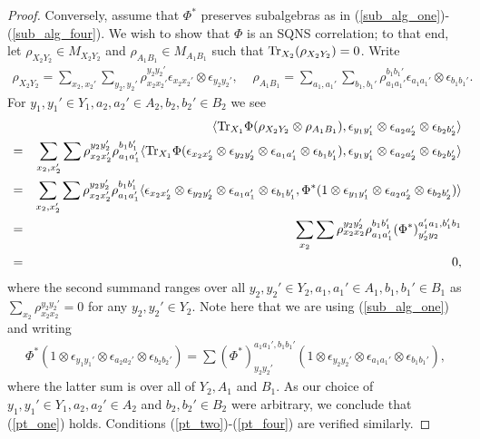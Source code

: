 \documentclass[11pt]{amsart}
\begin{document}
\begin{proof}
Conversely, assume that $\Phi^{*}$ preserves subalgebras as in (\ref{sub_alg_one})-(\ref{sub_alg_four}). We wish to show that $\Phi$ is an SQNS correlation; to that end, let $\rho_{X_{2}Y_{2}} \in M_{X_{2}Y_{2}}$ and $\rho_{A_{1}B_{1}} \in M_{A_{1}B_{1}}$ such that ${\rm Tr}_{X_{2}}(\rho_{X_{2}Y_{2}}) = 0$. Write
\begin{gather*}
	\rho_{X_{2}Y_{2}} = \sum\limits_{x_{2}, x_{2}'}\sum\limits_{y_{2}, y_{2}'}\rho_{x_{2}x_{2}'}^{y_{2}y_{2}'}\epsilon_{x_{2}x_{2}'}\otimes \epsilon_{y_{2}y_{2}'}, \;\;\;\; \rho_{A_{1}B_{1}} = \sum\limits_{a_{1}, a_{1}'}\sum\limits_{b_{1}, b_{1}'}\rho_{a_{1}a_{1}'}^{b_{1}b_{1}'}\epsilon_{a_{1}a_{1}'}\otimes \epsilon_{b_{1}b_{1}'}.
\end{gather*}
\noindent For $y_{1}, y_{1}' \in Y_{1}, a_{2}, a_{2}' \in A_{2}, b_{2}, b_{2}' \in B_{2}$ we see
\begin{eqnarray*}
& &
\langle {\rm Tr}_{X_{1}}\Phi(\rho_{X_{2}Y_{2}}\otimes \rho_{A_{1}B_{1}}), \epsilon_{y_{1}y_{1}'}\otimes \epsilon_{a_{2}a_{2}'}\otimes \epsilon_{b_{2}b_{2}'}\rangle \\
& = &
\sum\limits_{x_{2}, x_{2}'}\sum\rho_{x_{2}x_{2}'}^{y_{2}y_{2}'}\rho_{a_{1}a_{1}'}^{b_{1}b_{1}'}\langle {\rm Tr}_{X_{1}}\Phi(\epsilon_{x_{2}x_{2}'}\otimes \epsilon_{y_{2}y_{2}'}\otimes \epsilon_{a_{1}a_{1}'}\otimes \epsilon_{b_{1}b_{1}'}), \epsilon_{y_{1}y_{1}'}\otimes \epsilon_{a_{2}a_{2}'}\otimes \epsilon_{b_{2}b_{2}'}\rangle \\
& = &
\sum\limits_{x_{2}, x_{2}'}\sum\rho_{x_{2}x_{2}'}^{y_{2}y_{2}'}\rho_{a_{1}a_{1}'}^{b_{1}b_{1}'}\langle \epsilon_{x_{2}x_{2}'}\otimes \epsilon_{y_{2}y_{2}'}\otimes \epsilon_{a_{1}a_{1}'}\otimes \epsilon_{b_{1}b_{1}'}, \Phi^{*}(1\otimes \epsilon_{y_{1}y_{1}'}\otimes \epsilon_{a_{2}a_{2}'}\otimes \epsilon_{b_{2}b_{2}'})\rangle \\
& =  &
\sum\limits_{x_{2}}\sum\rho_{x_{2}x_{2}}^{y_{2}y_{2}'}\rho_{a_{1}a_{1}'}^{b_{1}b_{1}'}(\Phi^{*})_{y_{2}'y_{2}}^{a_{1}'a_{1}, b_{1}'b_{1}} \\
& = &
0,
\end{eqnarray*}
\noindent where the second summand ranges over all $y_{2}, y_{2}' \in Y_{2}, a_{1}, a_{1}' \in A_{1}, b_{1}, b_{1}' \in B_{1}$ as $\sum\limits_{x_{2}}\rho_{x_{2}x_{2}}^{y_{2}y_{2}'} = 0$ for any $y_{2}, y_{2}' \in Y_{2}$. Note here that we are using (\ref{sub_alg_one}) and writing
\begin{gather*}
	\Phi^{*}(1\otimes \epsilon_{y_{1}y_{1}'}\otimes \epsilon_{a_{2}a_{2}'}\otimes \epsilon_{b_{2}b_{2}'}) = \sum (\Phi^{*})_{y_{2}y_{2}'}^{a_{1}a_{1}', b_{1}b_{1}'}(1\otimes \epsilon_{y_{2}y_{2}'}\otimes \epsilon_{a_{1}a_{1}'}\otimes \epsilon_{b_{1}b_{1}'}),  
\end{gather*}                                                                    
\noindent where the latter sum is over all of $Y_{2}, A_{1}$ and $B_{1}$. As our choice of $y_{1}, y_{1}' \in Y_{1}, a_{2}, a_{2}' \in A_{2}$ and $b_{2}, b_{2}' \in B_{2}$ were arbitrary, we conclude that (\ref{pt_one}) holds. Conditions (\ref{pt_two})-(\ref{pt_four}) are verified similarly.                                        
\end{proof}
\end{document}
